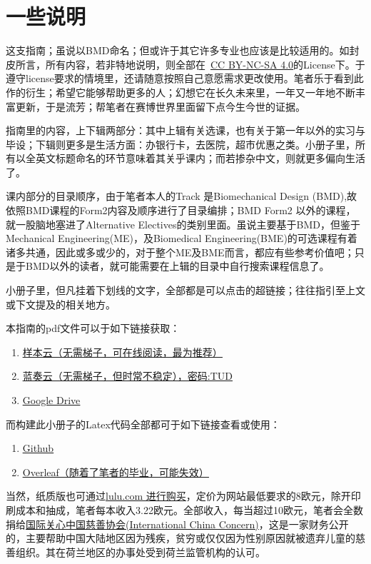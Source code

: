 \section{一些说明}
这支指南；虽说以BMD命名；但或许于其它许多专业也应该是比较适用的。如封皮所言，所有内容，若非特地说明，则全部在\ccbyncsa\ \href{http://creativecommons.org/licenses/by-nc-sa/4.0/}{\uline{CC BY-NC-SA 4.0}}的License下。于遵守license要求的情境里，还请随意按照自己意愿需求更改使用。笔者乐于看到此作的衍生；希望它能够帮助更多的人；幻想它在长久未来里，一年又一年地不断丰富更新，于是流芳；帮笔者在赛博世界里面留下点今生今世的证据。

指南里的内容，上下辑两部分：其中上辑有关选课，也有关于第一年以外的实习与毕设；下辑则更多是生活方面：办银行卡，去医院，超市优惠之类。小册子里，所有以全英文标题命名的环节意味着其关乎课内；而若掺杂中文，则就更多偏向生活了。

课内部分的目录顺序，由于笔者本人的Track 是Biomechanical Design (BMD),故依照BMD课程的Form2内容及顺序进行了目录编排；BMD Form2 以外的课程，就一股脑地塞进了Alternative Electives的类别里面。虽说主要基于BMD，但鉴于Mechanical Engineering(ME)，及Biomedical Engineering(BME)的可选课程有着诸多共通，因此或多或少的，对于整个ME及BME而言，都应有些参考价值吧；只是于BMD以外的读者，就可能需要在上辑的目录中自行搜索课程信息了。

小册子里，但凡挂着下划线的文字，全部都是可以点击的超链接；往往指引至上文或下文提及的相关地方。

本指南的pdf文件可以于如下链接获取：
\begin{enumerate}
\item \href{https://book.baige.me/view/c1l}{\uline{样本云（无需梯子，可在线阅读，最为推荐）}}
\item \href{https://wwkg.lanzoup.com/b04q5cmch}{\uline{蓝奏云（无需梯子，但时常不稳定），密码:TUD}}
\item \href{https://drive.google.com/drive/folders/1rxghlV072abqS7_6GpjdmStmXHPLw4bG?usp=sharing}{\uline{Google Drive}} 
\end{enumerate}

而构建此小册子的Latex代码全部都可于如下链接查看或使用：
\begin{enumerate}
\item \href{https://github.com/HochanWang/BMD-ZhiNan}{\uline{Github}}
\item \href{https://www.overleaf.com/9181971742xyhrjrdxdzkt}{\uline{Overleaf（随着了笔者的毕业，可能失效）}}
\end{enumerate}

当然，纸质版也可通过\href{https://www.lulu.com/shop/haochen-wang/me%E6%8C%87%E5%8D%97/paperback/product-8vmyjk.html?q=TUD&page=1&pageSize=4}{\uline{lulu.com 进行购买}}，定价为网站最低要求的8欧元，除开印刷成本和抽成，笔者每本收入3.22欧元。全部收入，每当超过10欧元，笔者会全数捐给\href{https://chinaconcern.org/zh_hans/?fbclid=IwAR263C_R6_XiYRZrUrad-3TvXTMNcJAJWlTMwOiNIhiyCmAGR3GjPwBWH0w}{\uline{国际关心中国慈善协会(International China Concern)}}，这是一家财务公开的，主要帮助中国大陆地区因为残疾，贫穷或仅仅因为性别原因就被遗弃儿童的慈善组织。其在荷兰地区的办事处受到荷兰监管机构的认可。

